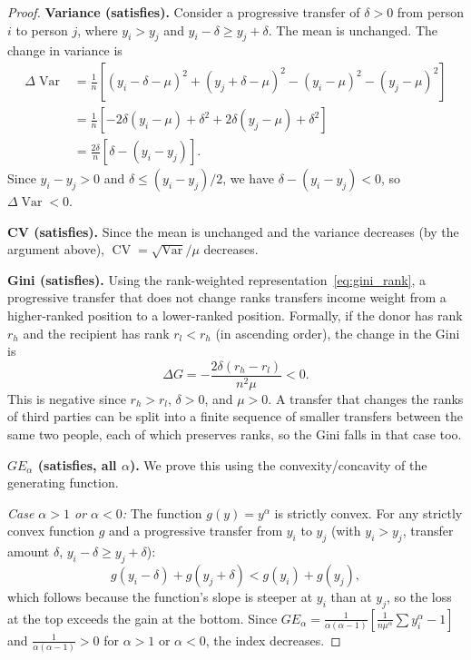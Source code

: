 \documentclass[12pt]{article}
\theoremstyle{plain}
\theoremstyle{definition}
\theoremstyle{remark}
\begin{document}
\begin{proof}
\textbf{Variance (satisfies).}
Consider a progressive transfer of $\delta > 0$ from person $i$ to person $j$, where $y_i > y_j$ and $y_i - \delta \geq y_j + \delta$.
The mean is unchanged.
The change in variance is
\begin{align}
\Delta\operatorname{Var} &= \frac{1}{n}\left[(y_i - \delta - \mu)^2 + (y_j + \delta - \mu)^2 - (y_i - \mu)^2 - (y_j - \mu)^2\right] \nonumber\\
&= \frac{1}{n}\left[-2\delta(y_i - \mu) + \delta^2 + 2\delta(y_j - \mu) + \delta^2\right] \nonumber\\
&= \frac{2\delta}{n}\left[\delta - (y_i - y_j)\right]. \label{eq:var_transfer}
\end{align}
Since $y_i - y_j > 0$ and $\delta \leq (y_i - y_j)/2$, we have $\delta - (y_i - y_j) < 0$, so $\Delta\operatorname{Var} < 0$.

\textbf{CV (satisfies).}
Since the mean is unchanged and the variance decreases (by the argument above), $\operatorname{CV} = \sqrt{\operatorname{Var}}/\mu$ decreases.

\textbf{Gini (satisfies).}
Using the rank-weighted representation~\eqref{eq:gini_rank}, a progressive transfer that does not change ranks transfers income weight from a higher-ranked position to a lower-ranked position.
Formally, if the donor has rank $r_h$ and the recipient has rank $r_l < r_h$ (in ascending order), the change in the Gini is
\begin{equation}\label{eq:gini_transfer}
\Delta G = -\frac{2\delta(r_h - r_l)}{n^2\mu} < 0.
\end{equation}
This is negative since $r_h > r_l$, $\delta > 0$, and $\mu > 0$.
A transfer that changes the ranks of third parties can be split into a finite sequence of smaller transfers between the same two people, each of which preserves ranks, so the Gini falls in that case too.

\textbf{$GE_\alpha$ (satisfies, all $\alpha$).}
We prove this using the convexity/concavity of the generating function.

\emph{Case $\alpha > 1$ or $\alpha < 0$:} The function $g(y) = y^\alpha$ is strictly convex.
For any strictly convex function $g$ and a progressive transfer from $y_i$ to $y_j$ (with $y_i > y_j$, transfer amount $\delta$, $y_i - \delta \geq y_j + \delta$):
\begin{equation}
g(y_i - \delta) + g(y_j + \delta) < g(y_i) + g(y_j),
\end{equation}
which follows because the function's slope is steeper at $y_i$ than at $y_j$, so the loss at the top exceeds the gain at the bottom.
Since $GE_\alpha = \frac{1}{\alpha(\alpha-1)}\left[\frac{1}{n\mu^\alpha}\sum y_i^\alpha - 1\right]$ and $\frac{1}{\alpha(\alpha-1)} > 0$ for $\alpha > 1$ or $\alpha < 0$, the index decreases.


\end{proof}
\end{document}

